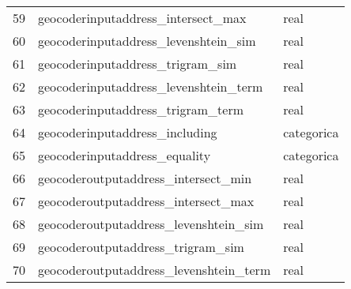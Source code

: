 \documentclass[journal]{IEEEtran}
\begin{document}
\begin{table}[ht!]
\begin{tabular}{l | l l }
59	& geocoderinputaddress\_intersect\_max  &   real  \\
60	& geocoderinputaddress\_levenshtein\_sim  &   real  \\
61	& geocoderinputaddress\_trigram\_sim  &   real  \\
62	& geocoderinputaddress\_levenshtein\_term  &   real  \\
63	& geocoderinputaddress\_trigram\_term  &   real  \\
64	& geocoderinputaddress\_including  &    categorica   \\
65	& geocoderinputaddress\_equality  &    categorica   \\
66	& geocoderoutputaddress\_intersect\_min  &   real  \\
67	& geocoderoutputaddress\_intersect\_max  &   real  \\
68	& geocoderoutputaddress\_levenshtein\_sim  &   real  \\
69	& geocoderoutputaddress\_trigram\_sim  &   real  \\
70	& geocoderoutputaddress\_levenshtein\_term  &   real  \\
\end{tabular}
\end{table}
\end{document}
